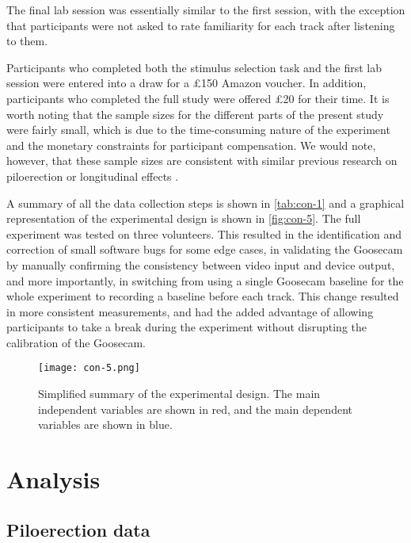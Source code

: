 The final lab session was essentially similar to the first session, with the exception that participants were not asked to rate familiarity for each track after listening to them.

Participants who completed both the stimulus selection task and the first lab session were entered into a draw for a \pounds150 Amazon voucher. In addition, participants who completed the full study were offered \pounds20 for their time. It is worth noting that the sample sizes for the different parts of the present study were fairly small, which is due to the time-consuming nature of the experiment and the monetary constraints for participant compensation. We would note, however, that these sample sizes are consistent with similar previous research on piloerection or longitudinal effects \parencite[e.g.,][]{bannister2018,madison2017,wassiliwizky2017a}.

A summary of all the data collection steps is shown in \autoref{tab:con-1} and a graphical representation of the experimental design is shown in \autoref{fig:con-5}. The full experiment was tested on three volunteers. This resulted in the identification and correction of small software bugs for some edge cases, in validating the Goosecam by manually confirming the consistency between video input and device output, and more importantly, in switching from using a single Goosecam baseline for the whole experiment to recording a baseline before each track. This change resulted in more consistent measurements, and had the added advantage of allowing participants to take a break during the experiment without disrupting the calibration of the Goosecam.



\begin{figure}[b!]
\texttt{[image: con-5.png]}
\centering
\caption{Simplified summary of the experimental design. The main independent variables are shown in red, and the main dependent variables are shown in blue.}
\label{fig:con-5}
\end{figure}

\section{Analysis}

\subsection{Piloerection data}

